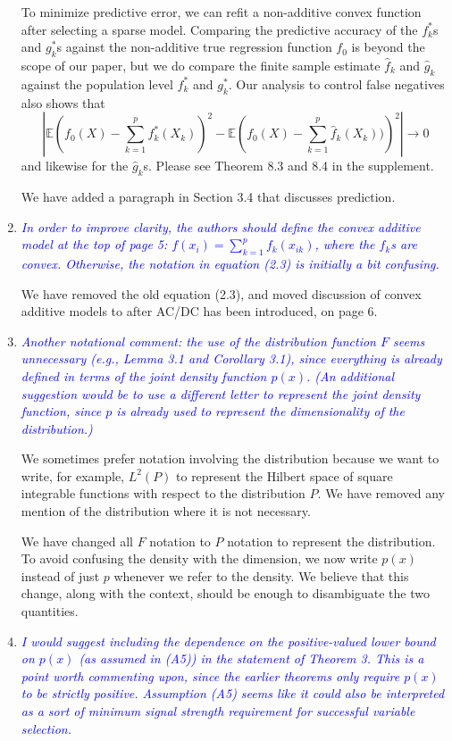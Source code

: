 \documentclass[pdftex,12pt]{article}
\let\hat\widehat
\def\rc#1{{\it\textcolor{blue}{#1}}\smallskip}
\begin{document}
\begin{enumerate}[(1)]
To minimize predictive error, we can refit a non-additive convex
function after selecting a sparse model. Comparing the predictive
accuracy of the $f^*_k$s and $g^*_k$s against the non-additive true
regression function $f_0$ is beyond the scope of our paper, but we do
compare the finite sample estimate $\hat{f}_k$ and $\hat{g}_k$ against
the population level $f^*_k$ and $g^*_k$. Our analysis to
control false negatives also shows that $$\left| \mathbb{E}\left(
f_0(X) - \sum_{k=1}^p f^*_k(X_k) \right)^2 - \mathbb{E} \left( f_0(X)
- \sum_{k=1}^p \hat{f}_k(X_k))\right)^2 \right| \rightarrow 0$$ and
likewise for the $\hat{g}_k$s. Please see Theorem 8.3 and 8.4 in the
supplement.

We have added a paragraph in Section 3.4 that discusses prediction. 

\item \rc{In order to improve clarity, the authors should define the convex
additive model at the top of page 5: $f(x_i) = \sum_{k=1}^p f_k(x_{ik})$, where the
$f_k$s are convex.  Otherwise, the notation in equation (2.3) is
initially a bit confusing.}

We have removed the old equation (2.3), and moved discussion of convex
additive models to after AC/DC has been introduced, on page 6.

\item \rc{Another notational comment: the use of the
distribution function $F$ seems unnecessary (e.g., Lemma 3.1 and
Corollary 3.1), since everything is already defined in terms of the
joint density function $p(x)$. (An additional suggestion would be to use
a different letter to represent the joint density function, since $p$ is
already used to represent the dimensionality of the distribution.)}

We sometimes prefer notation involving the distribution because we want to
write, for example, $L^2(P)$ to represent the Hilbert space
of square integrable functions with respect to the
distribution $P$. We have removed any mention of the distribution
where it is not necessary.

We have changed all $F$ notation to $P$ notation to represent the
distribution. To avoid confusing the density with the
dimension, we now write $p(x)$ instead of just $p$ whenever we
refer to the density. We believe that this change, along with the
context, should be enough to disambiguate the two quantities.

\item \rc{I would suggest including the dependence on the positive-valued lower
bound on $p(x)$ (as assumed in (A5)) in the statement of Theorem 3. This
is a point worth commenting upon, since the earlier theorems only
require $p(x)$ to be strictly positive. Assumption (A5) seems like it
could also be interpreted as a sort of minimum signal strength
requirement for successful variable selection.}


\end{enumerate}
\end{document}
